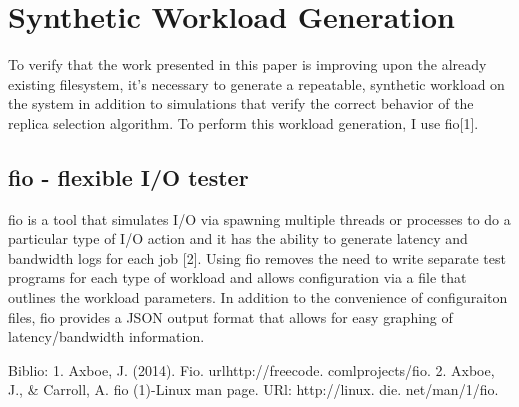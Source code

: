 \setlength{\topmargin}{-.5in}
\setlength{\textheight}{9in}
\setlength{\oddsidemargin}{.125in}
\setlength{\textwidth}{6.25in}

\author{Cyril Allen\\
Harvard Extension School}
\renewcommand{\today}{who knows}



\section{Synthetic Workload Generation}

To verify that the work presented in this paper is improving upon the already
existing filesystem, it's necessary to generate a repeatable, synthetic
workload on the system in addition to simulations that verify the correct
behavior of the replica selection algorithm. To perform this workload
generation, I use fio[1].

\subsection{fio - flexible I/O tester}

fio is a tool that simulates I/O via spawning multiple threads or processes to
do a particular type of I/O action and it has the ability to generate latency
and bandwidth logs for each job [2]. Using fio removes the need to write
separate test programs for each type of workload and allows configuration via a
file that outlines the workload parameters. In addition to the convenience of
configuraiton files, fio provides a JSON output format that allows for easy
graphing of latency/bandwidth information.






Biblio:
1. Axboe, J. (2014). Fio. urlhttp://freecode. comlprojects/fio.
2. Axboe, J., & Carroll, A. fio (1)-Linux man page. URl: http://linux. die. net/man/1/fio.
